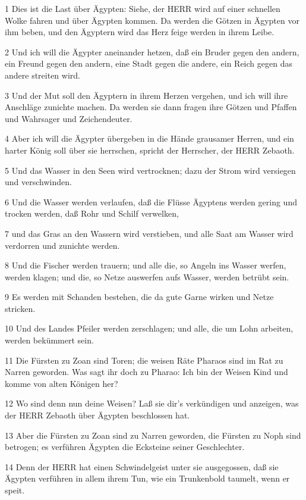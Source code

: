 \par 1 Dies ist die Last über Ägypten: Siehe, der HERR wird auf einer schnellen Wolke fahren und über Ägypten kommen. Da werden die Götzen in Ägypten vor ihm beben, und den Ägyptern wird das Herz feige werden in ihrem Leibe.
\par 2 Und ich will die Ägypter aneinander hetzen, daß ein Bruder gegen den andern, ein Freund gegen den andern, eine Stadt gegen die andere, ein Reich gegen das andere streiten wird.
\par 3 Und der Mut soll den Ägyptern in ihrem Herzen vergehen, und ich will ihre Anschläge zunichte machen. Da werden sie dann fragen ihre Götzen und Pfaffen und Wahrsager und Zeichendeuter.
\par 4 Aber ich will die Ägypter übergeben in die Hände grausamer Herren, und ein harter König soll über sie herrschen, spricht der Herrscher, der HERR Zebaoth.
\par 5 Und das Wasser in den Seen wird vertrocknen; dazu der Strom wird versiegen und verschwinden.
\par 6 Und die Wasser werden verlaufen, daß die Flüsse Ägyptens werden gering und trocken werden, daß Rohr und Schilf verwelken,
\par 7 und das Gras an den Wassern wird verstieben, und alle Saat am Wasser wird verdorren und zunichte werden.
\par 8 Und die Fischer werden trauern; und alle die, so Angeln ins Wasser werfen, werden klagen; und die, so Netze auswerfen aufs Wasser, werden betrübt sein.
\par 9 Es werden mit Schanden bestehen, die da gute Garne wirken und Netze stricken.
\par 10 Und des Landes Pfeiler werden zerschlagen; und alle, die um Lohn arbeiten, werden bekümmert sein.
\par 11 Die Fürsten zu Zoan sind Toren; die weisen Räte Pharaos sind im Rat zu Narren geworden. Was sagt ihr doch zu Pharao: Ich bin der Weisen Kind und komme von alten Königen her?
\par 12 Wo sind denn nun deine Weisen? Laß sie dir's verkündigen und anzeigen, was der HERR Zebaoth über Ägypten beschlossen hat.
\par 13 Aber die Fürsten zu Zoan sind zu Narren geworden, die Fürsten zu Noph sind betrogen; es verführen Ägypten die Ecksteine seiner Geschlechter.
\par 14 Denn der HERR hat einen Schwindelgeist unter sie ausgegossen, daß sie Ägypten verführen in allem ihrem Tun, wie ein Trunkenbold taumelt, wenn er speit.
